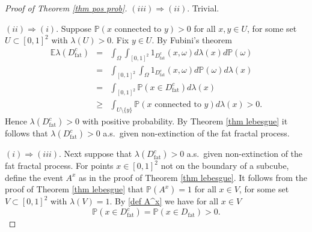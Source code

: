 \documentclass[11pt,a4paper]{article}
\newcommand{\IE}{\ensuremath{\mathbb{E}}}
\newcommand{\IP}{\ensuremath{\mathbb{P}}}
\theoremstyle{remark}
\begin{document}
\begin{proof}[Proof of Theorem \ref{thm pos prob}]
$(iii) \Rightarrow (ii)$. Trivial.


$(ii) \Rightarrow (i)$.  Suppose $\IP(x \mbox{ connected to } y) > 0$ for all $x,y \in U$, for some set $U\subset [0,1]^2$ with $\lambda(U) > 0$. Fix $y\in U$. By Fubini's theorem
\begin{eqnarray*}
\IE \lambda(D^c_{\text{fat}}) &=& \int_{\Omega} \int_{[0,1]^2} 1_{D^c_{\text{fat}}}(x,\omega) d\lambda(x) d\IP(\omega) \\
&=& \int_{[0,1]^2} \int_{\Omega} 1_{D^c_{\text{fat}}}(x,\omega) d\IP(\omega) d\lambda(x) \\
&=& \int_{[0,1]^2} \IP(x\in D^c_{\text{fat}}) d\lambda(x) \\
&\geq& \int_{U\setminus \{y\}} \IP(x \mbox{ connected to } y) d\lambda(x) > 0.
\end{eqnarray*}
Hence $\lambda(D^c_{\text{fat}}) > 0$ with positive probability. By Theorem \ref{thm lebesgue} it follows that $\lambda(D^c_{\text{fat}}) > 0$ a.s.\ given non-extinction of the fat fractal process.


$(i) \Rightarrow (iii)$. Next suppose that $\lambda(D^c_{\text{fat}}) > 0$ a.s.\ given non-extinction of the fat fractal process. For points $x\in[0,1]^2$ not on the boundary of a subcube, define the event $A^x$ as in the proof of Theorem \ref{thm lebesgue}. It follows from the proof of Theorem \ref{thm lebesgue} that $\IP(A^x)=1$ for all $x\in V$, for some set $V\subset[0,1]^2$ with $\lambda(V)=1$. By \eqref{def A^x} we have for all $x\in V$
\[
\IP(x\in D^c_{\text{fat}})= \IP(x\in D_{\text{fat}})>0.
\]



\end{proof}
\end{document}
